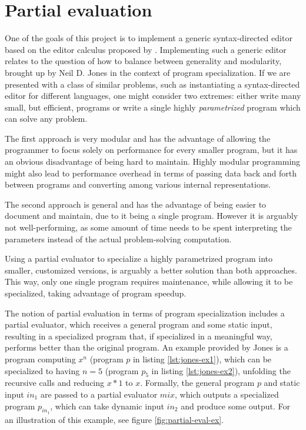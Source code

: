 \section{Partial evaluation}
One of the goals of this project is to implement a generic syntax-directed editor based on the editor calculus proposed by \cite{aalborg}. Implementing such a generic editor relates to the question of how to balance between generality and modularity, brought up by Neil D. Jones\cite{jones-partial-evaluation} in the context of program specialization. If we are presented with a class of similar problems, such as instantiating a syntax-directed editor for different languages, one might consider two extremes: either write many small, but efficient, programs or write a single highly \textit{parametrized} program which can solve any problem.

The first approach is very modular and has the advantage of allowing the programmer to focus solely on performance for every smaller program, but it has an obvious disadvantage of being hard to maintain. Highly modular programming might also lead to performance overhead in terms of passing data back and forth between programs and converting among various internal representations.

The second approach is general and has the advantage of being easier to document and maintain, due to it being a single program. However it is arguably not well-performing, as some amount of time needs to be spent interpreting the parameters instead of the actual problem-solving computation.

Using a partial evaluator\cite{jones96} to specialize a highly parametrized program into smaller, customized versions, is arguably a better solution than both approaches. This way, only one single program requires maintenance, while allowing it to be specialized, taking advantage of program speedup.

The notion of partial evaluation in terms of program specialization\cite{jones96} includes a partial evaluator, which receives a general program and some static input, resulting in a specialized program that, if specialized in a meaningful way, performs better than the original program. An example provided by Jones is a program computing $x^n$ (program $p$ in listing \ref{lst:jones-ex1}), which can be specialized to having $n = 5$ (program $p_5$ in listing \ref{lst:jones-ex2}), unfolding the recursive calls and reducing $x*1$ to $x$. Formally, the general program $p$ and static input $in_1$ are passed to a partial evaluator $mix$, which outputs a specialized program $p_{in_1}$, which can take dynamic input $in_2$ and produce some output. For an illustration of this example, see figure \ref{fig:partial-eval-ex}.

